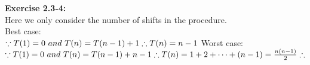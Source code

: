 \documentclass{article}
\begin{document}
\begin{spacing}{2.0}
\noindent
\textbf{Exercise 2.3-4:}\\
Here we only consider the number of shifts in the procedure.\\
Best case:\\
$
\because T(1) = 0\ and\ T(n) = T(n - 1) + 1\\
\therefore T(n) = n - 1\\
$
Worst case:\\
$
\because T(1) = 0\ and\ T(n) = T(n - 1) + n - 1\\
\therefore T(n) = 1 + 2 + \cdots + (n - 1) = \frac{n(n - 1)}{2}\\
\therefore 
$
\end{spacing}
\end{document}
